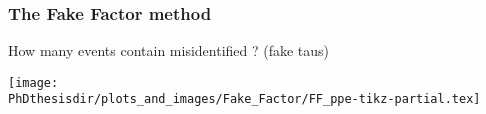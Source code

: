 \begin{frame}
\frametitle{The Fake Factor method}

\manip How many events contain misidentified \tauh? (fake taus)

\pause

\begin{center}
\texttt{[image: \\PhDthesisdir/plots\_and\_images/Fake\_Factor/FF\_ppe-tikz-partial.tex]}
\end{center}
\end{frame}

%

%
%
%
%
%
%
